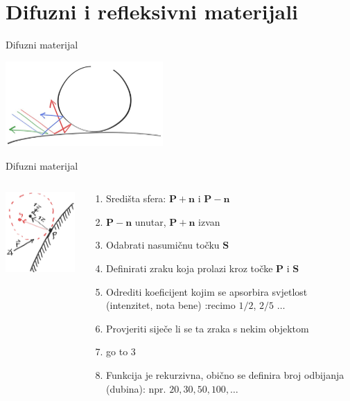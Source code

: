 \documentclass[9pt]{beamer}
\begin{document}
\section{Difuzni i refleksivni materijali}
\begin{frame}{Difuzni materijal}
	\begin{center}
		\includegraphics[width=6cm]{slike/fig-1.08-light-bounce.jpg}
	\end{center}

\end{frame}

\begin{frame}{Difuzni materijal}
	\begin{columns}
		\begin{column}{0.3\textwidth}
			\begin{center}
				\includegraphics[width=4cm]{slike/fig-1.09-rand-vec.jpg}
			\end{center}
		\end{column}
	\begin{column}{0.7\textwidth}
		\begin{enumerate}
			\item Središta sfera: $\mathbf{P} + \mathbf{n}$ i $\mathbf{P} - \mathbf{n}$
			\item $\mathbf{P} - \mathbf{n}$ unutar, $\mathbf{P} + \mathbf{n}$ izvan
			\item Odabrati nasumičnu točku $\mathbf{S}$
			\item Definirati zraku koja prolazi kroz točke $\mathbf{P}$ i $\mathbf{S}$
			\item Odrediti koeficijent kojim se apsorbira svjetlost (intenzitet, nota bene)  :recimo $1/2$, $2/5$ $\ldots$
			\item Provjeriti siječe li se ta zraka s nekim objektom
			\item go to 3
			\item Funkcija je rekurzivna, obično se definira broj odbijanja (dubina): npr. $20, 30, 50, 100, \ldots$
		\end{enumerate}
	\end{column}
	\end{columns}
\end{frame}
\end{document}
